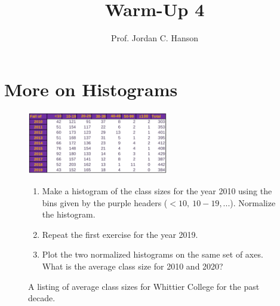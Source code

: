 \documentclass{article}
\begin{document}
\title{Warm-Up 4}
\author{Prof. Jordan C. Hanson}

\maketitle

\section{More on Histograms}

\begin{figure}[ht]
\centering
\includegraphics[width=0.55\textwidth]{class_size.png}
\caption{\label{fig:classsize} A listing of average class sizes for Whittier College for the past decade.}
\begin{enumerate}
\item Make a histogram of the class sizes for the year 2010 using the bins given by the purple headers ($<10,~10-19,...$). Normalize the histogram. \\ \vspace{3.5cm}
\item Repeat the first exercise for the year 2019. \\ \vspace{3.5cm}
\item Plot the two normalized histograms on the same set of axes.  What is the average class size for 2010 and 2020?
\end{enumerate}
\end{figure}
\end{document}
